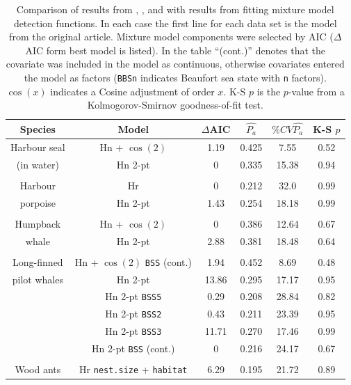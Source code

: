 \documentclass[authoryear,preprint,review,12pt]{elsarticle}
\begin{document}
\begin{table}
\caption[]{Comparison of results from , ,  and  with results from fitting mixture model detection functions. In each case the first line for each data set is the model from the original article. Mixture model components were selected by AIC ($\Delta$AIC form best model is listed). In the table ``(cont.)'' denotes that the covariate was included in the model as continuous, otherwise covariates entered the model as factors (\texttt{BBSn} indicates Beaufort sea state with \texttt{n} factors). $\cos(x)$ indicates a Cosine adjustment of order $x$. K-S $p$ is the $p$-value from a Kolmogorov-Smirnov goodness-of-fit test.}
\centering
\begin{tabular}{c c c c c c}
\hline \hline
Species & Model & $\Delta$AIC & $\hat{P_a}$ & $\% CV \hat{P_a}$ & K-S $p$\\
\hline
Harbour seal & Hn + $\cos(2)$ & 1.19 & 0.425 & 7.55 & 0.52\\
(in water) & Hn 2-pt  & 0 & 0.335 & 15.38 & 0.94\\
&&&&&\\
Harbour & Hr  & 0 & 0.212 & 32.0 & 0.99\\
porpoise & Hn 2-pt & 1.43 & 0.254 & 18.18 & 0.99\\
&&&&&\\
Humpback & Hn + $\cos(2)$ & 0 & 0.386 & 12.64 & 0.67 \\
whale & Hn 2-pt & 2.88 & 0.381 & 18.48 & 0.64 \\
&&&&&\\
Long-finned & Hn + $\cos(2)$ \texttt{BSS} (cont.) & 1.94 & 0.452 & 8.69 & 0.48\\ %
pilot whales  & Hn 2-pt          &  13.86  &  0.295  &  17.17  &  0.95 \\
 & Hn 2-pt \texttt{BSS5}         &  0.29   &  0.208  &  28.84  &  0.82 \\
 & Hn 2-pt  \texttt{BSS2}        &  0.43  &  0.211  &  23.39  &  0.95 \\
 & Hn 2-pt  \texttt{BSS3}        &  11.71 &  0.270  &  17.46  &  0.99 \\
 & Hn 2-pt  \texttt{BSS} (cont.) & 0  &  0.216  &  24.17  &  0.67 \\
 &&&&&\\
Wood ants & Hr \texttt{nest.size} + \texttt{habitat} & 6.29 & 0.195  & 21.72 & 0.89\\ %

\end{tabular}
\end{table}
\end{document}
